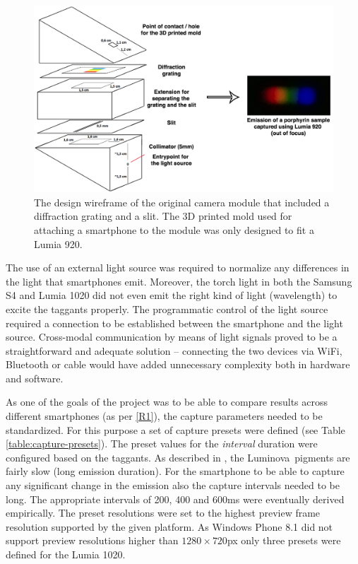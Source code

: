 \documentclass[thesis.tex]{subfiles}
\begin{document}
\begin{figure}[h!]
  \centering \includegraphics[page=1,width=\textwidth]{images/findings/original_camera_module}
  \caption{The design wireframe of the original camera module that included a diffraction grating and a slit. The 3D printed mold used for attaching a smartphone to the module was only designed to fit a Lumia 920.}
  \label{figure:origina-camera-module}
\end{figure}

The use of an external light source was required to normalize any differences in the light that smartphones emit. Moreover, the torch light in both the Samsung S4 and Lumia 1020 did not even emit the right kind of light (wavelength) to excite the taggants properly. The programmatic control of the light source required a connection to be established between the smartphone and the light source. Cross-modal communication by means of light signals proved to be a straightforward and adequate solution -- connecting the two devices via WiFi, Bluetooth or cable would have added unnecessary complexity both in hardware and software.

As one of the goals of the project was to be able to compare results across different smartphones (as per \ref{R1}), the capture parameters needed to be standardized. For this purpose a set of capture presets were defined (see Table \ref{table:capture-presets}). The preset values for the \emph{interval} duration were configured based on the taggants. As described in \cite{luminova}, the Luminova\textregistered\ pigments are fairly slow (long emission duration). For the smartphone to be able to capture any significant change in the emission also the capture intervals needed to be long. The appropriate intervals of 200, 400 and 600ms were eventually derived empirically. The preset resolutions were set to the highest preview frame resolution supported by the given platform. As Windows Phone 8.1 did not support preview resolutions higher than $1280\times720$px only three presets were defined for the Lumia 1020.
\end{document}
